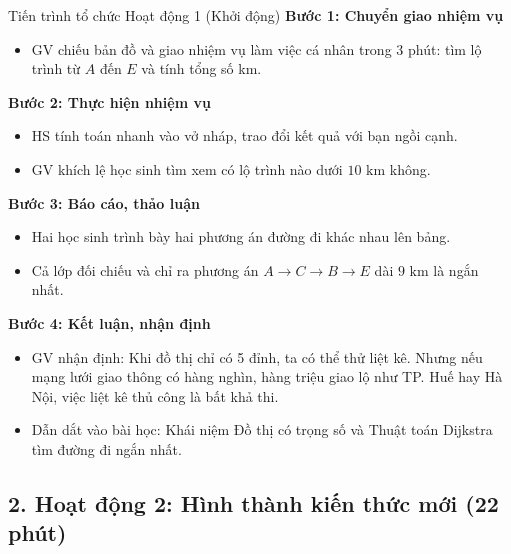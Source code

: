 \documentclass[12pt, a4paper]{article}
\begin{document}
\begin{pedabox}{Tiến trình tổ chức Hoạt động 1 (Khởi động)}
    \textbf{Bước 1: Chuyển giao nhiệm vụ}
    \begin{itemize}[leftmargin=0.6cm]
        \item GV chiếu bản đồ và giao nhiệm vụ làm việc cá nhân trong 3 phút: tìm lộ trình từ $A$ đến $E$ và tính tổng số km.
    \end{itemize}

    \textbf{Bước 2: Thực hiện nhiệm vụ}
    \begin{itemize}[leftmargin=0.6cm]
        \item HS tính toán nhanh vào vở nháp, trao đổi kết quả với bạn ngồi cạnh.
        \item GV khích lệ học sinh tìm xem có lộ trình nào dưới $10\text{ km}$ không.
    \end{itemize}

    \textbf{Bước 3: Báo cáo, thảo luận}
    \begin{itemize}[leftmargin=0.6cm]
        \item Hai học sinh trình bày hai phương án đường đi khác nhau lên bảng.
        \item Cả lớp đối chiếu và chỉ ra phương án $A \to C \to B \to E$ dài $9\text{ km}$ là ngắn nhất.
    \end{itemize}

    \textbf{Bước 4: Kết luận, nhận định}
    \begin{itemize}[leftmargin=0.6cm]
        \item GV nhận định: Khi đồ thị chỉ có 5 đỉnh, ta có thể thử liệt kê. Nhưng nếu mạng lưới giao thông có hàng nghìn, hàng triệu giao lộ như TP. Huế hay Hà Nội, việc liệt kê thủ công là bất khả thi.
        \item Dẫn dắt vào bài học: Khái niệm Đồ thị có trọng số và Thuật toán Dijkstra tìm đường đi ngắn nhất.
    \end{itemize}
\end{pedabox}

\subsection*{2. Hoạt động 2: Hình thành kiến thức mới (22 phút)}
\end{document}
